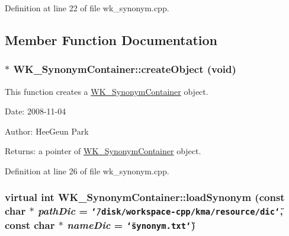 Definition at line 22 of file wk\_\-synonym.cpp.

\subsection{Member Function Documentation}
\hypertarget{classWK__SynonymContainer_fa754cbf496ae4419d3c145ca8e7513d}{
\subsubsection[{createObject}]{ $\ast$ WK\_\-SynonymContainer::createObject (void)}}
\label{classWK__SynonymContainer_fa754cbf496ae4419d3c145ca8e7513d}


This function creates a \hyperlink{classWK__SynonymContainer}{WK\_\-SynonymContainer} object. 

\begin{Desc}
\item[Date:]2008-11-04 \end{Desc}
\begin{Desc}
\item[Author:]HeeGeun Park \end{Desc}
\begin{Desc}
\item[Returns:]a pointer of \hyperlink{classWK__SynonymContainer}{WK\_\-SynonymContainer} object. \end{Desc}


Definition at line 26 of file wk\_\-synonym.cpp.\hypertarget{classWK__SynonymContainer_9e7ec0d46d3db686ef5b0d3b9719b96d}{
\subsubsection[{loadSynonym}]{\setlength{\rightskip}{0pt plus 5cm}virtual int WK\_\-SynonymContainer::loadSynonym (const char $\ast$ {\em pathDic} = {\tt \char`\"{}/disk/workspace-cpp/kma/resource/dic\char`\"{}}, \/  const char $\ast$ {\em nameDic} = {\tt \char`\"{}synonym.txt\char`\"{}})}}
\label{classWK__SynonymContainer_9e7ec0d46d3db686ef5b0d3b9719b96d}



